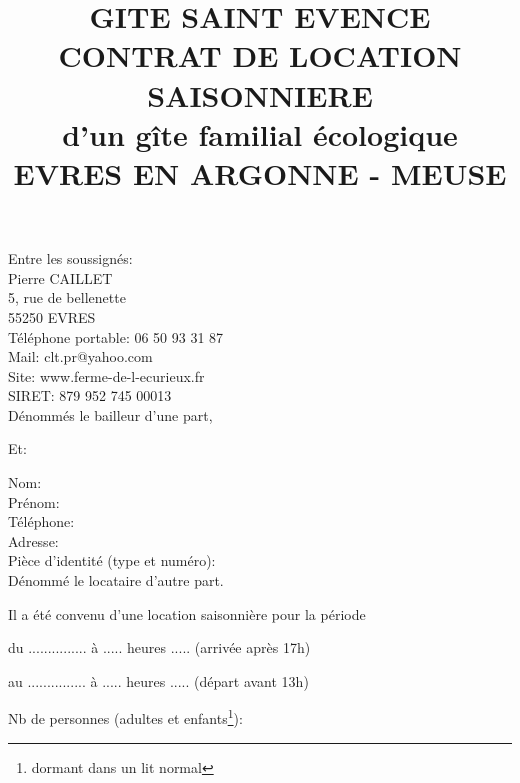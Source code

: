 \documentclass[a4paper,11pt]{article}
\title{GITE SAINT EVENCE\\CONTRAT DE LOCATION SAISONNIERE\\d’un gîte familial écologique\\EVRES EN ARGONNE - MEUSE}
\begin{document}
\date{}
\maketitle

\center Entre les soussignés:\\
\flushleft 
Pierre CAILLET\\
5, rue de bellenette\\
55250 EVRES\\                                                                                         
Téléphone portable: 06 50 93 31 87 \\
Mail: clt.pr@yahoo.com\\
Site: www.ferme-de-l-ecurieux.fr\\
SIRET: 879 952 745 00013\\

\vspace{0.5cm}
Dénommés le bailleur d’une part,                            

\center Et:

\flushleft
Nom:\\
Prénom:\\
Téléphone:\\
Adresse:\\
Pièce d'identité (type et numéro):\\

\vspace{0.5cm}
Dénommé le locataire d'autre part.



\flushleft
Il a été convenu d'une location saisonnière pour la période
\vspace{0.5cm}

du   ...............   à .....    heures .....    (arrivée après 17h)
\vspace{0.5cm}

au   ...............   à .....    heures .....   (départ avant 13h)
\vspace{0.5cm}

Nb de personnes (adultes et enfants\footnote{dormant dans un lit normal}): 
\vspace{0.5cm}

\newpage{}




\vspace{0.5cm}
\end{document}
